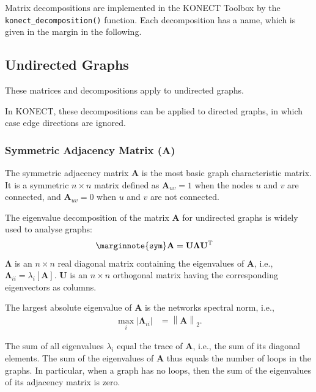 \documentclass{article}
\begin{document}
Matrix decompositions are implemented in the KONECT Toolbox by the
\texttt{konect\_decomposition()} function.  Each decomposition has a
name, which is given in the margin in the following. 

\subsection{Undirected Graphs}
These matrices and decompositions apply to undirected graphs.

In KONECT, these decompositions can be applied to directed graphs, in
which case edge directions are ignored. 

\subsubsection{Symmetric Adjacency Matrix ($\mathbf A$)}
The symmetric adjacency matrix $\mathbf A$ is the most basic graph
characteristic matrix.  It is a symmetric $n \times n$ matrix defined as
$\mathbf A_{uv}=1$ when the nodes $u$ and $v$ are connected, and
$\mathbf A_{uv}=0$ when $u$ and $v$ are not connected. 

The eigenvalue decomposition of the matrix $\mathbf A$ for undirected
graphs is widely used to analyse graphs: 
\begin{align}
  \marginnote{\texttt{sym}}
  \mathbf A &= \mathbf U \mathbf \Lambda \mathbf U^{\mathrm T}
\end{align}
$\mathbf \Lambda$ is an $n \times n$ real diagonal matrix containing the
eigenvalues of $\mathbf A$, i.e., $\mathbf \Lambda_{ii} =
\lambda_i[\mathbf A]$.  
$\mathbf U$ is an $n \times n$ orthogonal matrix having the
corresponding eigenvectors as columns. 

The largest absolute eigenvalue of $\mathbf A$ is the networks spectral norm,
i.e.,
\begin{align*}
  \max_i |\mathbf \Lambda_{ii}| &= \left\| \mathbf A \right\|_2.
\end{align*}

The sum of all eigenvalues $\lambda_i$ equal the trace of $\mathbf A$,
i.e., the sum of its diagonal elements.  The sum of the eigenvalues of
$\mathbf A$ thus equals the number of loops in the graphs. 
In particular, when a graph
has no loops, then the sum of the eigenvalues of its adjacency matrix is
zero.  
\end{document}
